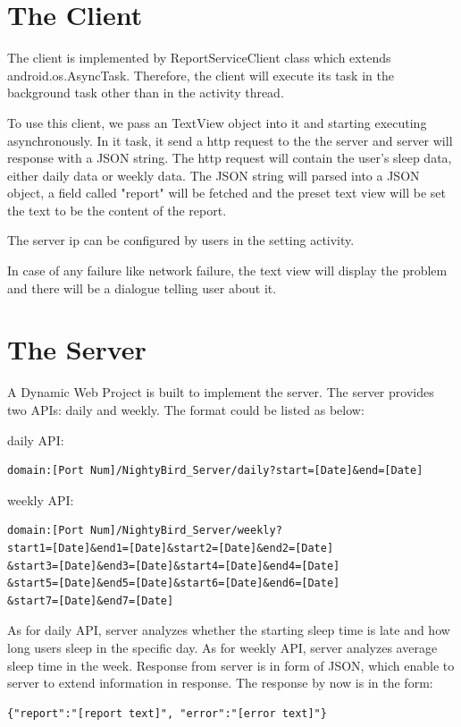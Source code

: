 \documentclass[14pt]{extreport}
\begin{document}
\section{The Client}
The client is implemented by ReportServiceClient class which extends android.os.AsyncTask. Therefore, the client will execute its task in the background task other than in the activity thread.

To use this client, we pass an TextView object into it and starting executing asynchronously. In it task, it send a http request to the the server and server will response with a JSON string.  The http request will contain the user's sleep data, either daily data or weekly data. The JSON string will parsed into a JSON object, a field called "report" will be fetched and the preset text view will be set the text to be the content of the report.

The server ip can be configured by users in the setting activity.

In case of any failure like network failure, the text view will display the problem and there will be a dialogue telling user about it.

\section{The Server}
A Dynamic Web Project is built to implement the server.  The server provides two APIs: daily and weekly. The format could be listed as below:

daily  API:\\
\begin{verbatim}
domain:[Port Num]/NightyBird_Server/daily?start=[Date]&end=[Date]
\end{verbatim}

weekly API:\\
\begin{verbatim}
domain:[Port Num]/NightyBird_Server/weekly?
start1=[Date]&end1=[Date]&start2=[Date]&end2=[Date]
&start3=[Date]&end3=[Date]&start4=[Date]&end4=[Date]
&start5=[Date]&end5=[Date]&start6=[Date]&end6=[Date]
&start7=[Date]&end7=[Date]
\end{verbatim}

As for daily API, server analyzes whether the starting sleep time is late and how long users sleep in the specific day. As for weekly API, server analyzes average sleep time in the week. Response from server is in form of JSON, which enable to server to extend information in response. The response by now is in the form:
\begin{verbatim}
{"report":"[report text]", "error":"[error text]"}
\end{verbatim}
\end{document}
